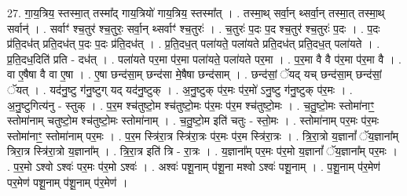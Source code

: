 \documentclass[17pt]{extarticle}
\begin{document}
27. गा॒य॒त्रिय॒ स्तस्मा॒त् तस्मा᳚द् गाय॒त्रियो॑ गाय॒त्रिय॒ स्तस्मा᳚त् । . तस्मा॒थ् सर्वा॒न् थ्सर्वा॒न् तस्मा॒त् तस्मा॒थ् सर्वान्॑ । . सर्वाꣳ॑ श्च॒तुर॑ श्च॒तुरः॒ सर्वा॒न् थ्सर्वाꣳ॑ श्च॒तुरः॑ । . च॒तुरः॑ प॒दः प॒द श्च॒तुर॑ श्च॒तुरः॑ प॒दः । . प॒दः प्र॑ति॒दध॑त् प्रति॒दध॑त् प॒दः प॒दः प्र॑ति॒दध॑त् । . प्र॒ति॒दध॒त् पला॑यते॒ पला॑यते प्रति॒दध॑त् प्रति॒दध॒त् पला॑यते । . प्र॒ति॒दध॒दिति॑ प्रति - दध॑त् । . पला॑यते पर॒मा प॑र॒मा पला॑यते॒ पला॑यते पर॒मा । . प॒र॒मा वै वै प॑र॒मा प॑र॒मा वै । . वा ए॒षैषा वै वा ए॒षा । . ए॒षा छन्द॑सा॒म् छन्द॑सा मे॒षैषा छन्द॑साम् । . छन्द॑सां॒ ॅयद् यच् छन्द॑सा॒म् छन्द॑सां॒ ॅयत् । . यद॑नु॒ष्टु ग॑नु॒ष्टुग् यद् यद॑नु॒ष्टुक् । . अ॒नु॒ष्टुक् प॑र॒मः प॑र॒मो॑ ऽनु॒ष्टु ग॑नु॒ष्टुक् प॑र॒मः । . अ॒नु॒ष्टुगित्य॑नु - स्तुक् । . प॒र॒म श्च॑तुष्टो॒म श्च॑तुष्टो॒मः प॑र॒मः प॑र॒म श्च॑तुष्टो॒मः । . च॒तु॒ष्टो॒मः स्तोमा॑नाꣳ॒॒ स्तोमा॑नाम् चतुष्टो॒म श्च॑तुष्टो॒मः स्तोमा॑नाम् । . च॒तु॒ष्टो॒म इति॑ चतुः - स्तो॒मः । . स्तोमा॑नाम् पर॒मः प॑र॒मः स्तोमा॑नाꣳ॒॒ स्तोमा॑नाम् पर॒मः । . प॒र॒म स्त्रि॑रा॒त्र स्त्रि॑रा॒त्रः प॑र॒मः प॑र॒म स्त्रि॑रा॒त्रः । . त्रि॒रा॒त्रो य॒ज्ञानां᳚ ॅय॒ज्ञाना᳚म् त्रिरा॒त्र स्त्रि॑रा॒त्रो य॒ज्ञाना᳚म् । . त्रि॒रा॒त्र इति॑ त्रि - रा॒त्रः । . य॒ज्ञाना᳚म् पर॒मः प॑र॒मो य॒ज्ञानां᳚ ॅय॒ज्ञाना᳚म् पर॒मः । . प॒र॒मो ऽश्वो ऽश्वः॑ पर॒मः प॑र॒मो ऽश्वः॑ । . अश्वः॑ पशू॒नाम् प॑शू॒ना मश्वो ऽश्वः॑ पशू॒नाम् । . प॒शू॒नाम् प॑र॒मेण॑ पर॒मेण॑ पशू॒नाम् प॑शू॒नाम् प॑र॒मेण॑ । \newline
\end{document}
